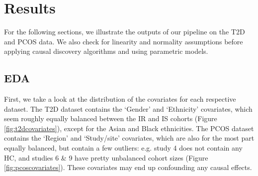 \documentclass[12pt,letterpaper]{article}
\begin{document}
\section{Results}

For the following sections, we illustrate the outputs of our pipeline on the T2D and PCOS data. We also check for linearity and normality assumptions before applying causal discovery algorithms and using parametric models. 

\subsection{EDA}

First, we take a look at the distribution of the covariates for each respective dataset. The T2D dataset contains the ‘Gender’ and ‘Ethnicity’ covariates, which seem roughly equally balanced between the IR and IS cohorts (Figure \ref{fig:t2dcovariates}), except for the Asian and Black ethnicities. The PCOS dataset contains the ‘Region’ and ‘Study/site’ covariates, which are also for the most part equally balanced, but contain a few outliers: e.g. study 4 does not contain any HC, and studies 6 \& 9 have pretty unbalanced cohort sizes (Figure \ref{fig:pcoscovariates}). These covariates may end up confounding any causal effects. 
\end{document}
